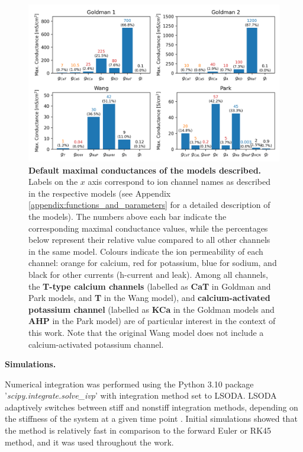 \documentclass[../main.tex]{subfiles}
\begin{document}
\begin{figure}[!t]
    \centering
    \includegraphics[width=\linewidth]{../img/materials_and_methods/model_conductances.png}
    \caption[Default maximal conductances of the models described]{
        \textbf{Default maximal conductances of the models described.} Labels on the $x$ axis correspond to ion channel names as described in the respective models (see Appendix \ref{appendix:functions_and_parameters} for a detailed description of the models).
        The numbers above each bar indicate the corresponding maximal conductance values, while the percentages below represent their relative value compared to all other channels in the same model.
        Colours indicate the ion permeability of each channel: orange for calcium, red for potassium, blue for sodium, and black for other currents (h-current and leak).
        Among all channels, the \textbf{T-type calcium channels} (labelled as \textbf{CaT} in Goldman and Park models, and \textbf{T} in the Wang model), and \textbf{calcium-activated potassium channel} (labelled as \textbf{KCa} in the Goldman models and \textbf{AHP} in the Park model) are of particular interest in the context of this work. Note that the original Wang model does not include a calcium-activated potassium channel.
    }
    \label{fig:model_conductances}
\end{figure}


\vspace*{0.3cm}
\noindent\textbf{Simulations.}

Numerical integration was performed using the Python 3.10 package '\textit{scipy.integrate.solve\_ivp}' with integration method set to LSODA. LSODA adaptively switches between stiff and nonstiff integration methods, depending on the stiffness of the system at a given time point \parencite{petzoldAutomaticSelectionMethods1983}. Initial simulations showed that the method is relatively fast in comparison to the forward Euler or RK45 method, and it was used throughout the work.
\end{document}
